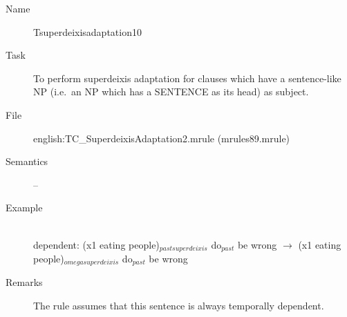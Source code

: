 \begin{description}
\vspace{1 cm}
\begin{description}
\item[Name]   Tsuperdeixisadaptation10
\item[Task] To perform superdeixis adaptation for clauses which have a
sentence-like NP (i.e.\ an NP which has a SENTENCE as its head) 
as subject. 
\item[File] english:TC\_SuperdeixisAdaptation2.mrule (mrules89.mrule)
\item[Semantics] --
\item[Example] \mbox{}\\
dependent: 
(x1 eating people)$_{pastsuperdeixis}$ do$_{past}$ be wrong $\rightarrow$
(x1 eating people)$_{omegasuperdeixis}$ do$_{past}$ be wrong
\item[Remarks] The rule assumes that this sentence is always temporally 
dependent.
\end{description}

\end{description}

\newpage
